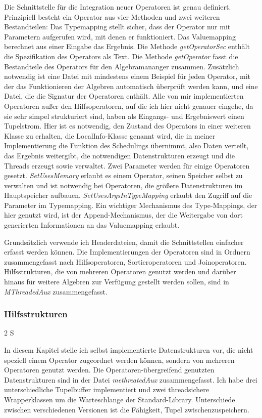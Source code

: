 \documentclass[a4paper,12pt,twoside]{article}
\newcommand{\Fb}[1]{\textit{#1}} %
\begin{document}
Die Schnittstelle für die Integration neuer Operatoren ist genau definiert. Prinzipiell besteht ein Operator aus vier Methoden und zwei weiteren Bestandteilen: Das Typemapping stellt sicher, dass der Operator nur mit Parametern aufgerufen wird, mit denen er funktioniert. Das Valuemapping berechnet aus einer Eingabe das Ergebnis. Die Methode \Fb{getOperatorSec} enthält die Spezifikation des Operators als Text. Die Methode \Fb{getOperator} fasst die Bestandteile des Operators für den Algebramananger zusammen. Zusätzlich notwendig ist eine Datei mit mindestens einem Beispiel für jeden Operator, mit der das Funktionieren der Algebren automatisch überprüft werden kann, und eine Datei, die die Signatur der Operatoren enthält. Alle von mir implementierten Operatoren außer den Hilfsoperatoren, auf die ich hier nicht genauer eingehe, da sie sehr simpel strukturiert sind, haben als Eingangs- und Ergebniswert einen Tupelstrom. Hier ist es notwendig, den Zustand des Operators in einer weiteren Klasse zu erhalten, die LocalInfo-Klasse genannt wird, die in meiner Implementierung die Funktion des Schedulings übernimmt, also Daten verteilt, das Ergebnis weitergibt, die notwendigen Datenstrukturen erzeugt und die Threads erzeugt sowie verwaltet. Zwei Parameter werden für einige Operatoren gesetzt. \Fb{SetUsesMemory} erlaubt es einem Operator, seinen Speicher selbst zu verwalten und ist notwendig bei Operatoren, die größere Datenstrukturen im Hauptspeicher aufbauen. \Fb{SetUsesArgsInTypeMapping} erlaubt den Zugriff auf die Parameter im Typemapping. Ein wichtiger Mechanismus des Type-Mappings, der hier genutzt wird, ist der Append-Mechanismus, der die Weitergabe von dort generierten Informationen an das Valuemapping erlaubt.

Grundsätzlich verwende ich Headerdateien, damit die Schnittstellen einfacher erfasst werden können. Die Implementierungen der Operatoren sind in Ordnern zusammengefasst nach Hilfsoperatoren, Sortieroperatoren und Joinoperatoren. Hilfsstrukturen, die von mehreren Operatoren genutzt werden und darüber hinaus für weitere Algebren zur Verfügung gestellt werden sollen, sind in \Fb{MThreadedAux} zusammengefasst.

\subsubsection{Hilfsstrukturen} 2 S
\label{Hilfsstrukturen} 

In diesem Kapitel stelle ich  selbst implementierte Datenstrukturen vor, die nicht speziell einem Operator zugeordnet werden können, sondern von mehreren Operatoren genutzt werden. Die Operatoren-übergreifend genutzten Datenstrukturen sind in der Datei \Fb{methreatedAux} zusammengefasst. Ich habe drei unterschiedliche Tupelbuffer implementiert und zwei threadsichere Wrapperklassen um die Warteschlange der Standard-Library. Unterschiede zwischen verschiedenen Versionen ist die Fähigkeit, Tupel zwischenzuspeichern.
\end{document}
